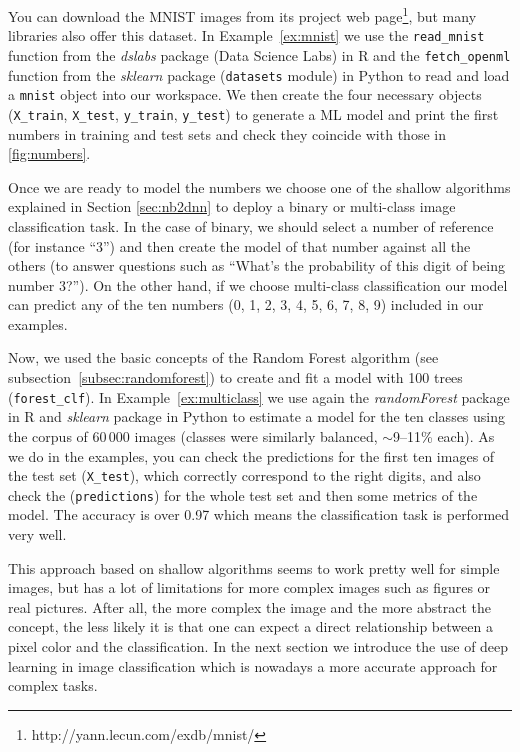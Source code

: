 You can download the MNIST images from its project web page\footnote{http://yann.lecun.com/exdb/mnist/}, but many libraries also offer this dataset. In Example~\ref{ex:mnist} we use the \texttt{read\_mnist} function from the \emph{dslabs} package (Data Science Labs) in R and the \texttt{fetch\_openml} function from the \emph{sklearn} package (\texttt{datasets} module) in Python to read and load a \texttt{mnist} object into our workspace. We then create the four necessary objects (\texttt{X\_train}, \texttt{X\_test}, \texttt{y\_train}, \texttt{y\_test}) to generate a ML model and print the first numbers in training and test sets and check they coincide with those in \ref{fig:numbers}.


Once we are ready to model the numbers we choose one of the shallow algorithms explained in Section \ref{sec:nb2dnn} to deploy a binary or multi-class image classification task. In the case of binary, we should select a number of reference (for instance ``3'') and then create the model of that number against all the others (to answer questions such as ``What's the probability of this digit of being number 3?''). On the other hand, if we choose multi-class classification our model can predict any of the ten numbers (0, 1, 2, 3, 4, 5, 6, 7, 8, 9) included in our examples.

Now, we used the basic concepts of the Random Forest algorithm (see subsection~\ref{subsec:randomforest}) to create and fit a model with 100 trees (\texttt{forest\_clf}). In Example~\ref{ex:multiclass} we use again the \emph{randomForest} package in R and \emph{sklearn} package in Python to estimate a model for the ten classes using the corpus of 60\,000 images (classes were similarly balanced, $\sim$9--11\% each). As we do in the examples, you can check the predictions for the first ten images of the test set (\texttt{X\_test}), which correctly correspond to the right digits, and also check the (\texttt{predictions}) for the whole test set and then some metrics of the model. The accuracy is over 0.97 which means the classification task is performed very well.


This approach based on shallow algorithms seems to work pretty well for simple images, but has a lot of limitations for more complex images such as figures or real pictures. After all, the more complex the image and the more abstract the concept, the less likely it is that one can expect a direct relationship between a pixel color and the classification. In the next section we introduce the use of deep learning in image classification which is nowadays a more accurate approach for complex tasks.


